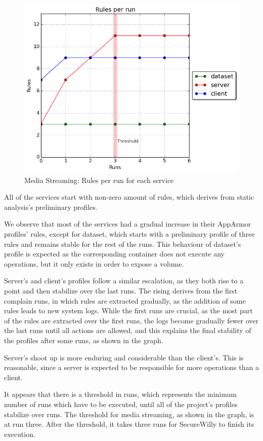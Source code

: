 \begin{figure}[h!]
  \centering
   \includegraphics[width=0.70\linewidth]{../figures/mediastreaming/rulesthreshold.png}
   \caption{Media Streaming: Rules per run for each service}
\end{figure}

All of the services start with non-zero amount of rules, which derives from static analysis's preliminary profiles.

We observe that most of the services had a gradual increase in their AppArmor profiles' rules, except for dataset, which starts with a preliminary profile of three rules and remains stable for the rest of the runs. This behaviour of dataset's profile is expected as the corresponding container does not execute any operations, but it only exists in order to expose a volume.

Server's and client's profiles follow a similar escalation, as they both rise to a point and then stabilize over the last runs. The rising derives from the first complain runs, in which rules are extracted gradually, as the addition of some rules leads to new system logs. While the first runs are crucial, as the most part of the rules are extracted over the first runs, the logs become gradually fewer over the last runs until all actions are allowed, and this explains the final stability of the profiles after some runs, as shown in the graph.

Server's shoot up is more enduring and considerable than the client's. This is reasonable, since a server is expected to be responsible for more operations than a client.  

It appears that there is a threshold in runs, which represents the minimum number of runs which have to be executed, until all of the project's profiles stabilize over runs. The threshold for media streaming, as shown in the graph, is at run three. After the threshold, it takes three runs for SecureWilly to finish its execution.

